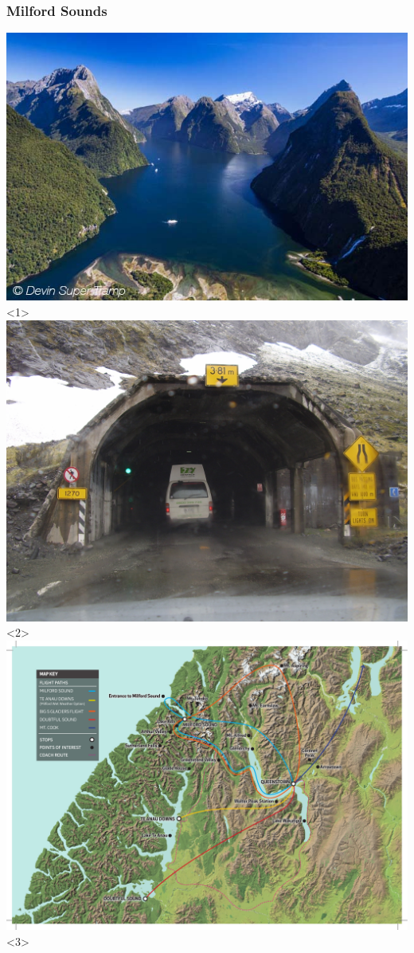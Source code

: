 \documentclass[12pt]{beamer}
\begin{document}
        \begin{frame}
            \frametitle{Milford Sounds}
                \begin{center}
                    \includegraphics[height=0.5\textheight]{images/milford-sounds.jpg}<1>
                    \includegraphics[height=0.5\textheight]{images/homer-tunnel.jpg}<2>
                    \includegraphics[height=0.5\textheight]{images/milford-sounds-map.jpg}<3>

\end{center}
\end{frame}
\end{document}
